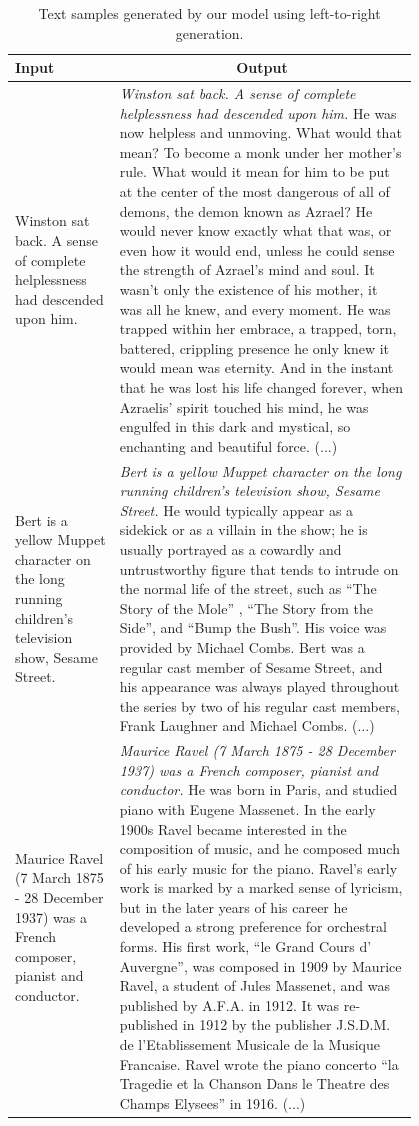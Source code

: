 \documentclass{article}
\begin{document}
\begin{appendices}
\begin{table}[t]
\begin{center}
\small
\begin{tabular}{p{0.2\linewidth}|p{0.6\linewidth}}
\toprule
\multicolumn{1}{l}{\textbf{Input}} &\multicolumn{1}{c}{\textbf{Output}}
\\ \midrule
Winston sat back. A sense of complete helplessness had descended upon him. & \textit{Winston sat back. A sense of complete helplessness had descended upon him.} He was now helpless and unmoving. What would that mean? To become a monk under her mother's rule. What would it mean for him to be put at the center of the most dangerous of all of demons, the demon known as Azrael? He would never know exactly what that was, or even how it would end, unless he could sense the strength of Azrael's mind and soul. It wasn't only the existence of his mother, it was all he knew, and every moment. He was trapped within her embrace, a trapped, torn, battered, crippling presence he only knew it would mean was eternity. And in the instant that he was lost his life changed forever, when Azraelis' spirit touched his mind, he was engulfed in this dark and mystical, so enchanting and beautiful force. (...)
\\ \midrule
Bert is a yellow Muppet character on the long running children's television show, Sesame Street. &
\textit{Bert is a yellow Muppet character on the long running children's television show, Sesame Street.} He would typically appear as a sidekick or as a villain in the show; he is usually portrayed as a cowardly and untrustworthy figure that tends to intrude on the normal life of the street, such as ``The Story of the Mole'' , ``The Story from the Side'', and ``Bump the Bush''. His voice was provided by Michael Combs. Bert was a regular cast member of Sesame Street, and his appearance was always played throughout the series by two of his regular cast members, Frank Laughner and Michael Combs. (...)
\\ \midrule
Maurice Ravel (7 March 1875 - 28 December 1937) was a French composer, pianist and conductor. & \textit{Maurice Ravel (7 March 1875 - 28 December 1937) was a French composer, pianist and conductor.} He was born in Paris, and studied piano with Eugene Massenet. In the early 1900s Ravel became interested in the composition of music, and he composed much of his early music for the piano. Ravel's early work is marked by a marked sense of lyricism, but in the later years of his career he developed a strong preference for orchestral forms. His first work, ``le Grand Cours d' Auvergne'', was composed in 1909 by Maurice Ravel, a student of Jules Massenet, and was published by A.F.A. in 1912. It was re-published in 1912 by the publisher J.S.D.M. de l'Etablissement Musicale de la Musique Francaise. Ravel wrote the piano concerto ``la Tragedie et la Chanson Dans le Theatre des Champs Elysees'' in 1916. (...) \\ \bottomrule
\end{tabular}
\end{center}
\caption{Text samples generated by our model using left-to-right generation.}
\label{text-sample}
\end{table}



\end{appendices}
\end{document}
